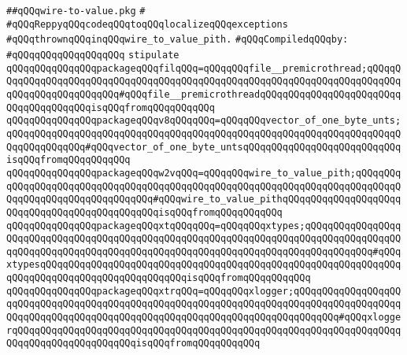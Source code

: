 \label{src/lib/x-kit/xclient/src/wire/wire-to-value.pkg}
\verb|##qQQqwire-to-value.pkg|\newline
\verb|#|\newline
\verb|#qQQqReppyqQQqcodeqQQqtoqQQqlocalizeqQQqexceptions|\newline
\verb|#qQQqthrownqQQqinqQQqwire_to_value_pith.|\newline
\newline
\verb|#qQQqCompiledqQQqby:|\newline
\verb|#qQQqqQQqqQQqqQQqqQQq|\newline
\newline
\verb|stipulate|\newline
\verb|qQQqqQQqqQQqqQQqpackageqQQqfilqQQq=qQQqqQQqfile__premicrothread;qQQqqQQqqQQqqQQqqQQqqQQqqQQqqQQqqQQqqQQqqQQqqQQqqQQqqQQqqQQqqQQqqQQqqQQqqQQqqQQqqQQqqQQqqQQqqQQq#qQQqfile__premicrothreadqQQqqQQqqQQqqQQqqQQqqQQqqQQqqQQqqQQqqQQqisqQQqfromqQQqqQQqqQQq|\newline
\verb|qQQqqQQqqQQqqQQqpackageqQQqv8qQQqqQQq=qQQqqQQqvector_of_one_byte_unts;qQQqqQQqqQQqqQQqqQQqqQQqqQQqqQQqqQQqqQQqqQQqqQQqqQQqqQQqqQQqqQQqqQQqqQQqqQQqqQQqqQQq#qQQqvector_of_one_byte_untsqQQqqQQqqQQqqQQqqQQqqQQqqQQqisqQQqfromqQQqqQQqqQQq|\newline
\verb|qQQqqQQqqQQqqQQqpackageqQQqw2vqQQq=qQQqqQQqwire_to_value_pith;qQQqqQQqqQQqqQQqqQQqqQQqqQQqqQQqqQQqqQQqqQQqqQQqqQQqqQQqqQQqqQQqqQQqqQQqqQQqqQQqqQQqqQQqqQQqqQQqqQQqqQQq#qQQqwire_to_value_pithqQQqqQQqqQQqqQQqqQQqqQQqqQQqqQQqqQQqqQQqqQQqqQQqisqQQqfromqQQqqQQqqQQq|\newline
\verb|qQQqqQQqqQQqqQQqpackageqQQqxtqQQqqQQq=qQQqqQQqxtypes;qQQqqQQqqQQqqQQqqQQqqQQqqQQqqQQqqQQqqQQqqQQqqQQqqQQqqQQqqQQqqQQqqQQqqQQqqQQqqQQqqQQqqQQqqQQqqQQqqQQqqQQqqQQqqQQqqQQqqQQqqQQqqQQqqQQqqQQqqQQqqQQqqQQqqQQq#qQQqxtypesqQQqqQQqqQQqqQQqqQQqqQQqqQQqqQQqqQQqqQQqqQQqqQQqqQQqqQQqqQQqqQQqqQQqqQQqqQQqqQQqqQQqqQQqqQQqqQQqisqQQqfromqQQqqQQqqQQq|\newline
\verb|qQQqqQQqqQQqqQQqpackageqQQqxtrqQQq=qQQqqQQqxlogger;qQQqqQQqqQQqqQQqqQQqqQQqqQQqqQQqqQQqqQQqqQQqqQQqqQQqqQQqqQQqqQQqqQQqqQQqqQQqqQQqqQQqqQQqqQQqqQQqqQQqqQQqqQQqqQQqqQQqqQQqqQQqqQQqqQQqqQQqqQQqqQQqqQQq#qQQqxloggerqQQqqQQqqQQqqQQqqQQqqQQqqQQqqQQqqQQqqQQqqQQqqQQqqQQqqQQqqQQqqQQqqQQqqQQqqQQqqQQqqQQqqQQqqQQqisqQQqfromqQQqqQQqqQQq|\newline
